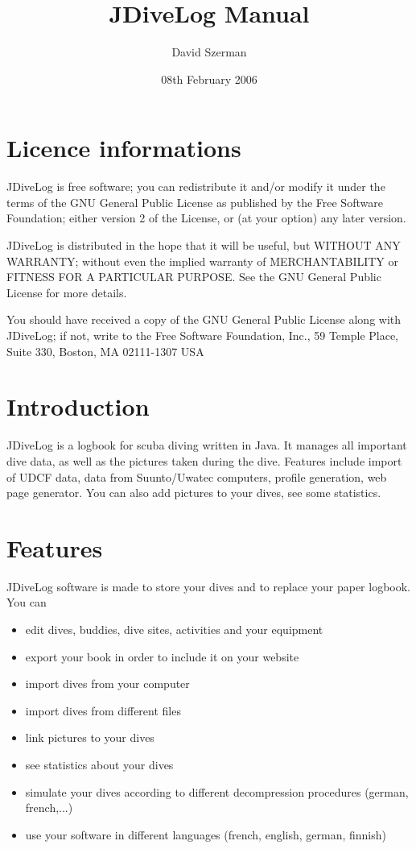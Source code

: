 \documentclass[10pt,a4paper,titlepage]{report}
\author{David Szerman}
\title{JDiveLog Manual}
\date{08th February 2006}
\begin{document}
\maketitle{}
\tableofcontents{}
\chapter{Licence informations}
JDiveLog is free software; you can redistribute it and/or modify it under the terms of the GNU General Public License as published by the Free Software Foundation; either version 2 of the License, or (at your option) any later version.

JDiveLog is distributed in the hope that it will be useful, but WITHOUT ANY WARRANTY; without even the implied warranty of MERCHANTABILITY or FITNESS FOR A PARTICULAR PURPOSE.  See the GNU General Public License for more details.

You should have received a copy of the GNU General Public License along with JDiveLog; if not, write to the Free Software Foundation, Inc., 59 Temple Place, Suite 330, Boston, MA  02111-1307  USA
\chapter{Introduction}
 JDiveLog is a logbook for scuba diving written in Java. It manages all important dive data, as well as the pictures taken during the dive. Features include import of UDCF data, data from Suunto/Uwatec computers, profile generation, web page generator.
You can also add pictures to your dives, see some statistics.
 
\chapter{Features}
JDiveLog software is made to store your dives and to replace your paper logbook.
You can
\begin{itemize}
\item edit dives, buddies, dive sites, activities and your equipment
\item export your book in order to include it on your website
\item import dives from your computer
\item import dives from different files
\item link pictures to your dives
\item see statistics about your dives
\item simulate your dives according to different decompression procedures (german, french,...)
\item use your software in different languages (french, english, german, finnish)
\end{itemize}
\end{document}
